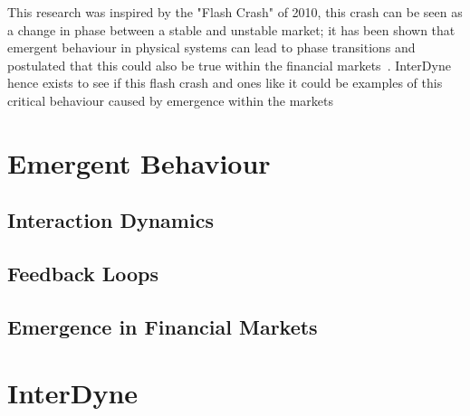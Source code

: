 \documentclass{article}
\begin{document}



This research was inspired by the "Flash Crash" of 2010, this crash can be seen as a change in phase between a stable and unstable market; it has been shown that emergent behaviour in physical systems can lead to phase transitions and postulated that this could also be true within the financial markets~\cite{networkcastphorynature}. InterDyne hence exists to see if this flash crash and ones like it could be examples of this critical behaviour caused by emergence within the markets


%



\section{Emergent Behaviour}

\subsection{Interaction Dynamics}

\subsection{Feedback Loops}

\subsection{Emergence in Financial Markets}

\section{InterDyne} 
\end{document}
